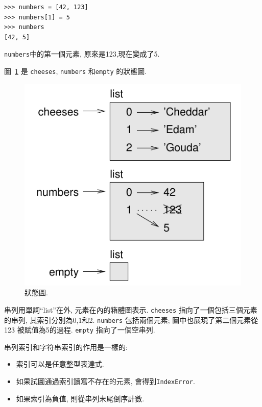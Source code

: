 \documentclass[10pt]{book}
\begin{document}
\begin{verbatim}
>>> numbers = [42, 123]
>>> numbers[1] = 5
>>> numbers
[42, 5]
\end{verbatim}
%
{\tt numbers}中的第一個元素, 原來是123,現在變成了5.


圖~\ref{fig.liststate} 是 {\tt cheeses}, {\tt numbers} 和{\tt empty} 的狀態圖.

\begin{figure}
\centerline
{\includegraphics[scale=0.8]{figs/liststate.pdf}}
\caption{狀態圖.}
\label{fig.liststate}
\end{figure}

串列用單詞``list''在外, 元素在內的箱體圖表示. 
{\tt cheeses} 指向了一個包括三個元素的串列, 其索引分別為0,1和2. 
{\tt numbers} 包括兩個元素; 圖中也展現了第二個元素從123 被賦值為5的過程. 
{\tt empty} 指向了一個空串列. 

串列索引和字符串索引的作用是一樣的:

\begin{itemize}

\item 索引可以是任意整型表達式.

\item 如果試圖通過索引讀寫不存在的元素, 會得到{\tt IndexError}.

\item 如果索引為負值, 則從串列末尾倒序計數. 

\end{itemize}
\end{document}
